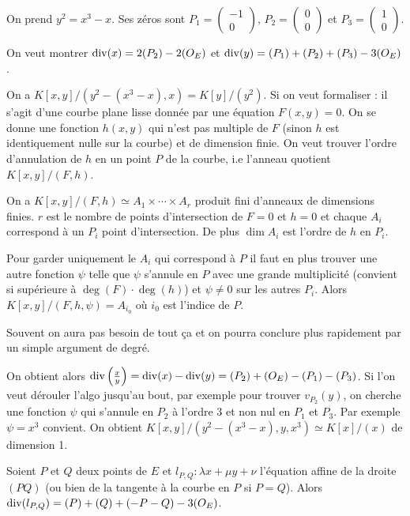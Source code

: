 	\begin{exc}
		On prend $y^2 = x^3 - x$.
		Ses zéros sont $P_1 = \begin{pmatrix} -1 \\ 0 \end{pmatrix}$, $P_2 = \begin{pmatrix} 0 \\ 0 \end{pmatrix}$ et $P_3 = \begin{pmatrix} 1 \\ 0 \end{pmatrix}$.
		
		On veut montrer $\operatorname{div}(x) = 2 (P_2) - 2 (O_E)$ et $\operatorname{div}(y) = (P_1) + (P_2) + (P_3) - 3(O_E)$.
		
		On a $K[x,y] / (y^2 - (x^3 - x), x) = K[y]/(y^2)$.
		Si on veut formaliser : il s'agit d'une courbe plane lisse donnée par une équation $F(x,y) = 0$.
		On se donne une fonction $h(x,y)$ qui n'est pas multiple de $F$ (sinon $h$ est identiquement nulle sur la courbe) et de dimension finie.
		On veut trouver l'ordre d'annulation de $h$ en un point $P$ de la courbe, i.e l'anneau quotient $K[x,y]/(F,h)$.
		
		On a $K[x,y]/(F,h) \simeq A_1 \times \cdots \times  A_r$ produit fini d'anneaux de dimensions finies.
		$r$ est le nombre de points d'intersection de $F = 0$ et $h = 0$ et chaque $A_i$ correspond à un $P_i$ point d'intersection.
		De plus $\dim A_i$ est l'ordre de $h$ en $P_i$.
		
		Pour garder uniquement le $A_i$ qui correspond à $P$ il faut en plus trouver une autre fonction $\psi$ telle que $\psi$ s'annule en $P$ avec une grande multiplicité (convient si supérieure à $\deg(F) \cdot \deg(h)$) et $\psi \neq 0$ sur les autres $P_i$.
		Alors $K[x,y] / (F,h,\psi) = A_{i_0}$ où $i_0$ est l'indice de $P$.
		
		Souvent on aura pas besoin de tout ça et on pourra conclure plus rapidement par un simple argument de degré.
		
		On obtient alors $\operatorname{div} \left( \frac{x}{y} \right) = \operatorname{div}(x) - \operatorname{div}(y) = (P_2) + (O_E) - (P_1) - (P_3)$.
		Si l'on veut dérouler l'algo jusqu'au bout, par exemple pour trouver $v_{P_2}(y)$, on cherche une fonction $\psi$ qui s'annule en $P_2$ à l'ordre 3 et non nul en $P_1$ et $P_3$.
		Par exemple $\psi = x^3$ convient.
		On obtient $K[x,y] / (y^2 - (x^3 - x), y, x^3) \simeq K[x]/(x)$ de dimension 1.
	\end{exc}
	
	\begin{lem}
		Soient $P$ et $Q$ deux points de $E$ et $l_{P,Q} : \lambda x + \mu y + \nu$ l'équation affine de la droite $(PQ)$ (ou bien de la tangente à la courbe en $P$ si $P = Q$).
		Alors $\operatorname{div}(l_{P,Q}) = (P) + (Q) + (-P-Q) - 3(O_E)$.
	\end{lem}
	
